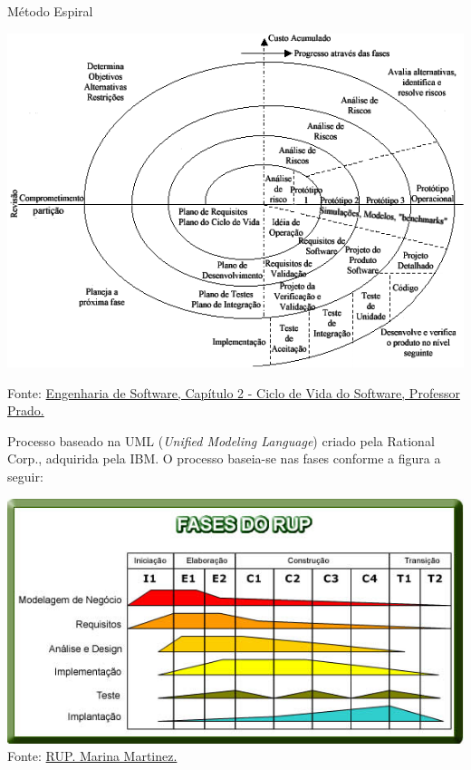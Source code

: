 \begin{frame}{Método Espiral}

\includegraphics[scale=.4]{img/spiral.png}

\vfill
{\tiny Fonte: \href{http://www2.dem.inpe.br/ijar/CicoloVidaSoftPrado.html}{Engenharia de Software, Capítulo 2 - Ciclo de Vida do Software, Professor Prado.}}
\end{frame}



\begin{frame}{\insertlecture}
  Processo baseado na UML ({\em Unified Modeling Language}) criado
  pela Rational Corp., adquirida pela IBM. O processo baseia-se nas
  fases conforme a figura a seguir:

  \begin{center}
    \includegraphics[scale=.6]{img/fasesRUP.png}\\
    {\tiny Fonte: \href{https://www.infoescola.com/engenharia-de-software/rup/}{RUP. Marina Martinez.}}
  \end{center}
\end{frame}

